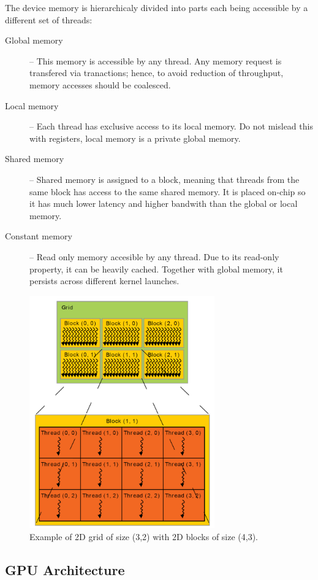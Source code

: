 The device memory is hierarchicaly divided into parts each being accessible by a different set of threads:
\begin{description}
	\item[Global memory] -- This memory is accessible by any thread. Any memory request is transfered via tranactions; hence, to avoid reduction of throughput, memory accesses should be coalesced. 
	\item[Local memory] -- Each thread has exclusive access to its local memory. Do not mislead this with registers, local memory is a private global memory.
	\item[Shared memory] -- Shared memory is assigned to a block, meaning that threads from the same block has access to the same shared memory. It is placed on-chip so it has much lower latency and higher bandwith than the global or local memory.
	\item[Constant memory] -- Read only memory accesible by any thread. Due to its read-only property, it can be heavily cached. Together with global memory, it persists across different kernel launches.
\end{description}

\begin{figure}\centering
	\includegraphics[width=8cm]{img/grid}
	\caption{Example of 2D grid of size (3,2) with 2D blocks of size (4,3).}
	\label{fig02:grid}
\end{figure}

\subsection{GPU Architecture}

